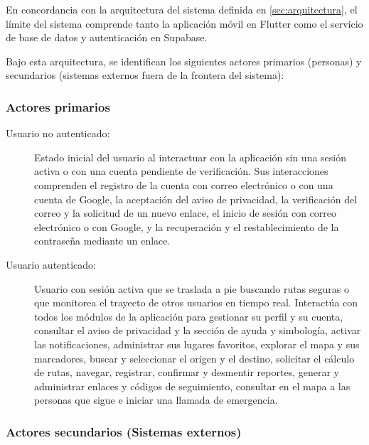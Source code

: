 En concordancia con la arquitectura del sistema definida en \ref{sec:arquitectura}, el límite del sistema comprende tanto la aplicación móvil en Flutter como el servicio de base de datos y autenticación en Supabase.

Bajo esta arquitectura, se identifican los siguientes actores primarios (personas) y secundarios (sistemas externos fuera de la frontera del sistema):

\subsubsection{Actores primarios}

\begin{description}
    \item[Usuario no autenticado:] Estado inicial del usuario al interactuar con la aplicación sin una sesión activa o con una cuenta pendiente de verificación. Sus interacciones comprenden el registro de la cuenta con correo electrónico o con una cuenta de Google, la aceptación del aviso de privacidad, la verificación del correo y la solicitud de un nuevo enlace, el inicio de sesión con correo electrónico o con Google, y la recuperación y el restablecimiento de la contraseña mediante un enlace.

    \item[Usuario autenticado:] Usuario con sesión activa que se traslada a pie buscando rutas seguras o que monitorea el trayecto de otros usuarios en tiempo real. Interactúa con todos los módulos de la aplicación para gestionar su perfil y su cuenta, consultar el aviso de privacidad y la sección de ayuda y simbología, activar las notificaciones, administrar sus lugares favoritos, explorar el mapa y sus marcadores, buscar y seleccionar el origen y el destino, solicitar el cálculo de rutas, navegar, registrar, confirmar y desmentir reportes, generar y administrar enlaces y códigos de seguimiento, consultar en el mapa a las personas que sigue e iniciar una llamada de emergencia.
\end{description}

\subsubsection{Actores secundarios (Sistemas externos)}

